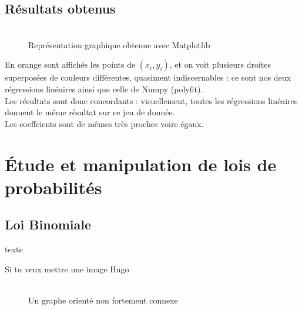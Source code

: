 \documentclass{article}      %
\begin{document}
\subsection{Résultats obtenus}
\begin{figure}[H]
    \centering
    \\Représentation graphique obtenue avec Matplotlib
\end{figure}
%
En orange sont affichés les points de $(x_i, y_i)$, et on voit plusieurs droites superposées de couleurs différentes, quasiment indiscernables : ce sont nos deux régressions linéaires ainsi que celle de Numpy (polyfit).
\\Les résultats sont donc concordants : visuellement, toutes les régressions linéaires donnent le même résultat sur ce jeu de donnée.
%
\\Les coeffcients sont de mêmes très proches voire égaux.

\section{Étude et manipulation de lois de probabilités}
\subsection{Loi Binomiale}
texte

Si tu veux mettre une image Hugo
\begin{figure}[H]
    \centering
     \scalebox{.35}{  %
    }
    \\Un graphe orienté non fortement connexe
\end{figure}
\end{document}
